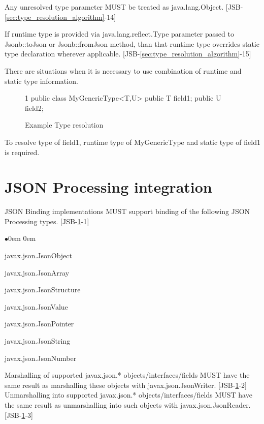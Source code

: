 Any unresolved type parameter MUST be treated as java.lang.Object. [JSB-\ref{sec:type_resolution_algorithm}-14]

If runtime type is provided via java.lang.reflect.Type parameter passed to Jsonb::toJson or Jsonb::fromJson method, than that runtime type overrides static type declaration wherever applicable. [JSB-\ref{sec:type_resolution_algorithm}-15]

There are situations when it is necessary to use combination of runtime and static type information. 
\begin{figure}[hbtp]
\caption{Example Type resolution}
\label{ex2}
\begin{listing}{1}
public class MyGenericType<T,U> {
    public T field1;
    public U field2;
}\end{listing}
\end{figure}

To resolve type of field1, runtime type of MyGenericType and static type of field1 is required.

\section{JSON Processing integration}
\label{sec:jsonp_integration}
JSON Binding implementations MUST support binding of the following JSON Processing types. [JSB-\ref{sec:jsonp_integration}-1]

\begin{list}{$\bullet$}{\parsep 0em  0em}
\item javax.json.JsonObject
\item javax.json.JsonArray
\item javax.json.JsonStructure
\item javax.json.JsonValue
\item javax.json.JsonPointer
\item javax.json.JsonString
\item javax.json.JsonNumber
\end{list}

Marshalling of supported javax.json.* objects/interfaces/fields MUST have the same result as marshalling these objects with javax.json.JsonWriter. [JSB-\ref{sec:jsonp_integration}-2]
Unmarshalling into supported javax.json.* objects/interfaces/fields MUST have the same result as unmarshalling into such objects with javax.json.JsonReader. [JSB-\ref{sec:jsonp_integration}-3]